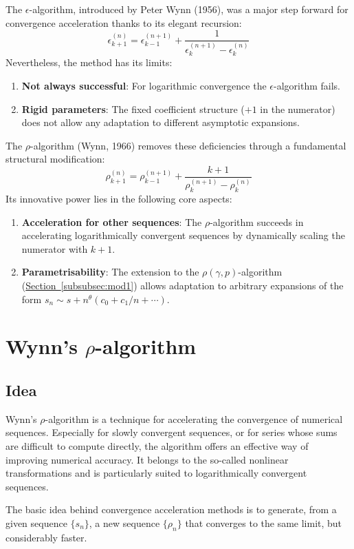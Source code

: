 \documentclass[a4paper,12pt]{article}
\numberwithin{equation}{section}
\newcommand{\secref}[1]{\hyperref[#1]{Section~\ref*{#1}}}
\theoremstyle{remark}
\begin{document}
The $\epsilon$-algorithm, introduced by Peter Wynn (1956), was a major step forward for convergence acceleration thanks to its elegant recursion:
\[
\epsilon_{k+1}^{(n)} = \epsilon_{k-1}^{(n+1)} + \frac{1}{\epsilon_k^{(n+1)} - \epsilon_k^{(n)}}
\]
Nevertheless, the method has its limits:
\begin{enumerate}
\item \textbf{Not always successful}: For logarithmic convergence the $\epsilon$-algorithm fails.
\item \textbf{Rigid parameters}: The fixed coefficient structure ($+1$ in the numerator) does not allow any adaptation to different asymptotic expansions.
\end{enumerate}
The $\rho$-algorithm (Wynn, 1966) removes these deficiencies through a fundamental structural modification:
\[
\rho_{k+1}^{(n)} = \rho_{k-1}^{(n+1)} + \frac{k+1}{\rho_k^{(n+1)} - \rho_k^{(n)}}
\]
Its innovative power lies in the following core aspects:
\begin{enumerate}
\item \textbf{Acceleration for other sequences}: The $\rho$-algorithm succeeds in accelerating logarithmically convergent sequences by dynamically scaling the numerator with $k+1$.
\item \textbf{Parametrisability}: The extension to the $\rho(\gamma,p)$-algorithm (\secref{subsubsec:mod1}) allows adaptation to arbitrary expansions of the form $s_n \sim s + n^\theta(c_0 + c_1/n + \cdots)$.
\end{enumerate}

\section{Wynn's $\rho$-algorithm}\label{sec:wynn}
\subsection{Idea}\label{subsec:idee}

Wynn's $\rho$-algorithm is a technique for accelerating the convergence of numerical sequences. Especially for slowly convergent sequences, or for series whose sums are difficult to compute directly, the algorithm offers an effective way of improving numerical accuracy. It belongs to the so-called nonlinear transformations and is particularly suited to logarithmically convergent sequences.

The basic idea behind convergence acceleration methods is to generate, from a given sequence $\{s_n\}$, a new sequence $\{\rho_n\}$ that converges to the same limit, but considerably faster.
\end{document}
